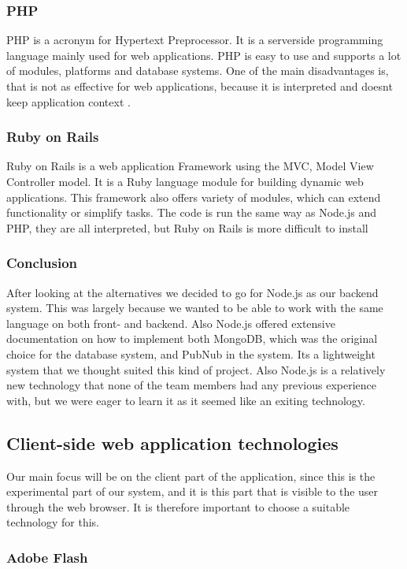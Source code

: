 \subsubsection*{PHP}
PHP is a acronym for Hypertext Preprocessor. It is a serverside programming language mainly used for web applications. PHP is easy to use and supports a lot of modules, platforms and database systems. One of the main disadvantages is, that is not as effective for web applications, because it is interpreted and doesnt keep application context \cite{php-whatis}.

\subsubsection*{Ruby on Rails}
Ruby on Rails is a web application Framework using the MVC, Model View Controller model. It is a Ruby language module for building dynamic web applications. This framework also offers variety of modules, which can extend functionality or simplify tasks. The code is run the same way as Node.js and PHP, they are all interpreted, but Ruby on Rails is more difficult to install \cite{ror-about}

\subsubsection{Conclusion}
After looking at the alternatives we decided to go for Node.js as our backend system. This was largely because we wanted to be able to work with the same language on both front- and backend. Also Node.js offered extensive documentation on how to implement both MongoDB, which was the original choice for the database system, and PubNub in the system. Its a lightweight system that we thought suited this kind of project. Also Node.js is a relatively new technology that none of the team members had any previous experience with, but we were eager to learn it as it seemed like an exiting technology.

\subsection{Client-side web application technologies}
Our main focus will be on the client part of the application, since this is the experimental part of our system, and it is this part that is visible to the user through the web browser. It is therefore important to choose a suitable technology for this.

\subsubsection{Adobe Flash}

